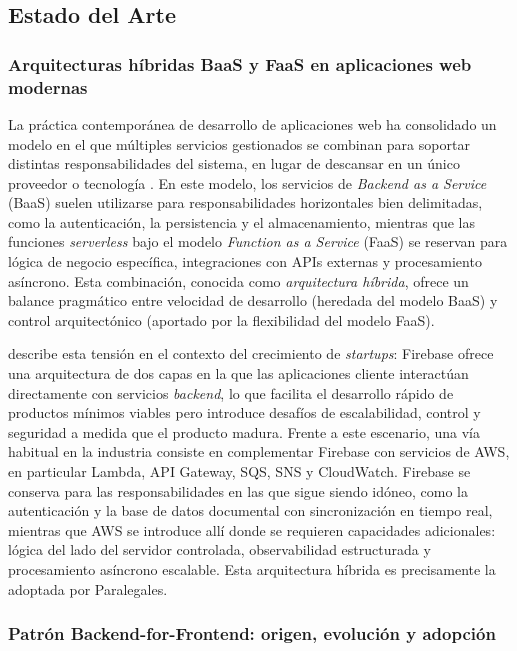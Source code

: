 \subsection{Estado del Arte}

\subsubsection{Arquitecturas híbridas BaaS y FaaS en aplicaciones web modernas}

La práctica contemporánea de desarrollo de aplicaciones web ha consolidado un modelo en el que múltiples servicios gestionados se combinan para soportar distintas responsabilidades del sistema, en lugar de descansar en un único proveedor o tecnología \cite{Newman2021}. En este modelo, los servicios de \textit{Backend as a Service} (BaaS) suelen utilizarse para responsabilidades horizontales bien delimitadas, como la autenticación, la persistencia y el almacenamiento, mientras que las funciones \textit{serverless} bajo el modelo \textit{Function as a Service} (FaaS) se reservan para lógica de negocio específica, integraciones con APIs externas y procesamiento asíncrono. Esta combinación, conocida como \textit{arquitectura híbrida}, ofrece un balance pragmático entre velocidad de desarrollo (heredada del modelo BaaS) y control arquitectónico (aportado por la flexibilidad del modelo FaaS).

\textcite{Michael2021} describe esta tensión en el contexto del crecimiento de \textit{startups}: Firebase ofrece una arquitectura de dos capas en la que las aplicaciones cliente interactúan directamente con servicios \textit{backend}, lo que facilita el desarrollo rápido de productos mínimos viables pero introduce desafíos de escalabilidad, control y seguridad a medida que el producto madura. Frente a este escenario, una vía habitual en la industria consiste en complementar Firebase con servicios de AWS, en particular Lambda, API Gateway, SQS, SNS y CloudWatch. Firebase se conserva para las responsabilidades en las que sigue siendo idóneo, como la autenticación y la base de datos documental con sincronización en tiempo real, mientras que AWS se introduce allí donde se requieren capacidades adicionales: lógica del lado del servidor controlada, observabilidad estructurada y procesamiento asíncrono escalable. Esta arquitectura híbrida es precisamente la adoptada por Paralegales.

\subsubsection{Patrón Backend-for-Frontend: origen, evolución y adopción}

